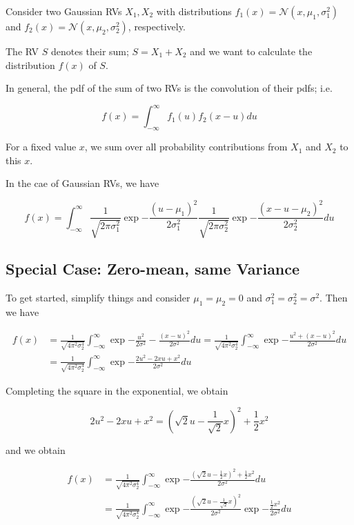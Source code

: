 

Consider two Gaussian RVs \(X_1, X_2\) with distributions
\(f_1(x) = \mathcal{N}(x, \mu_1, \sigma_1^2)\) and
\(f_2(x) = \mathcal{N}(x, \mu_2, \sigma_2^2)\), respectively.

The RV \(S\) denotes their sum; \(S = X_1 + X_2\) and we want to
calculate the distribution \(f(x)\) of \(S\).

In general, the pdf of the sum of two RVs is the convolution of their
pdfs; i.e.

\[
f(x) = \int_{-\infty}^\infty f_1(u) f_2(x-u) du
\]

For a fixed value \(x\), we sum over all probability contributions from
\(X_1\) and \(X_2\) to this \(x\).

In the cae of Gaussian RVs, we have

\[
f(x) = \int_{-\infty}^\infty \frac{1}{\sqrt{2\pi\sigma_1^2}} \exp{- \frac{(u-\mu_1)^2}{2\sigma_1^2}} \frac{1}{\sqrt{2\pi\sigma_2^2}} \exp{- \frac{(x - u-\mu_2)^2}{2\sigma_2^2}} du
\]

\subsection{Special Case: Zero-mean, same Variance}

To get started, simplify things and consider \(\mu_1 = \mu_2 = 0\) and
\(\sigma_1^2 = \sigma_2^2 = \sigma^2\). Then we have

\begin{align*}
f(x) &= \frac{1}{\sqrt{4\pi^2\sigma_2^4}} \int_{-\infty}^\infty  \exp{- \frac{u^2}{2\sigma^2} - \frac{(x-u)^2}{2\sigma^2}} du = \frac{1}{\sqrt{4\pi^2\sigma_2^4}} \int_{-\infty}^\infty  \exp{- \frac{u^2 + (x-u)^2}{2\sigma^2}} du \\ &= \frac{1}{\sqrt{4\pi^2\sigma_2^4}} \int_{-\infty}^\infty  \exp{- \frac{2u^2 - 2xu + x^2}{2\sigma^2}} du
\end{align*}

Completing the square in the exponential, we obtain

\[
2u^2 - 2xu + x^2 = \left(\sqrt{2}u - \frac{1}{\sqrt{2}}x\right)^2 + \frac{1}{2}x^2
\]

and we obtain

\begin{align*}
f(x) &= \frac{1}{\sqrt{4\pi^2\sigma_2^4}} \int_{-\infty}^\infty  \exp{- \frac{\left(\sqrt{2}u - \frac{1}{2}x\right)^2 + \frac{1}{2}x^2}{2\sigma^2}} du \\ &= \frac{1}{\sqrt{4\pi^2\sigma_2^4}} \int_{-\infty}^\infty \exp{- \frac{ \left(\sqrt{2}u - \frac{1}{\sqrt{2}} x\right)^2}{2\sigma^2}} \exp{- \frac{\frac{1}{2}x^2}{2\sigma^2}} du
\end{align*}


